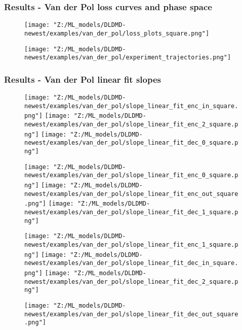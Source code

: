 \documentclass[11pt,aspectratio=169]{beamer}
\begin{document}
    \begin{frame}
        \frametitle{Results - Van der Pol loss curves and phase space}
        \begin{figure}
            \centering
            \begin{minipage}{.5\textwidth}
                \texttt{[image: "Z:/ML\_models/DLDMD-newest/examples/van\_der\_pol/loss\_plots\_square.png"]}
            \end{minipage}%
            \begin{minipage}{.5\textwidth}
                \texttt{[image: "Z:/ML\_models/DLDMD-newest/examples/van\_der\_pol/experiment\_trajectories.png"]}
            \end{minipage}
        \end{figure}
    \end{frame}

    \begin{frame}
        \frametitle{Results - Van der Pol linear fit slopes} 
        \begin{figure}
            \centering
            \begin{minipage}{.3333\textwidth}
                \texttt{[image: "Z:/ML\_models/DLDMD-newest/examples/van\_der\_pol/slope\_linear\_fit\_enc\_in\_square.png"]}
                \texttt{[image: "Z:/ML\_models/DLDMD-newest/examples/van\_der\_pol/slope\_linear\_fit\_enc\_2\_square.png"]}
                \texttt{[image: "Z:/ML\_models/DLDMD-newest/examples/van\_der\_pol/slope\_linear\_fit\_dec\_0\_square.png"]}
            \end{minipage}%
            \begin{minipage}{.3333\textwidth}
                \texttt{[image: "Z:/ML\_models/DLDMD-newest/examples/van\_der\_pol/slope\_linear\_fit\_enc\_0\_square.png"]}
                \texttt{[image: "Z:/ML\_models/DLDMD-newest/examples/van\_der\_pol/slope\_linear\_fit\_enc\_out\_square.png"]}
                \texttt{[image: "Z:/ML\_models/DLDMD-newest/examples/van\_der\_pol/slope\_linear\_fit\_dec\_1\_square.png"]}
            \end{minipage}%
            \begin{minipage}{.3333\textwidth}
                \texttt{[image: "Z:/ML\_models/DLDMD-newest/examples/van\_der\_pol/slope\_linear\_fit\_enc\_1\_square.png"]}
                \texttt{[image: "Z:/ML\_models/DLDMD-newest/examples/van\_der\_pol/slope\_linear\_fit\_dec\_in\_square.png"]}
                \texttt{[image: "Z:/ML\_models/DLDMD-newest/examples/van\_der\_pol/slope\_linear\_fit\_dec\_2\_square.png"]}
            \end{minipage}
            \texttt{[image: "Z:/ML\_models/DLDMD-newest/examples/van\_der\_pol/slope\_linear\_fit\_dec\_out\_square.png"]}
        \end{figure}
    \end{frame}
\end{document}
